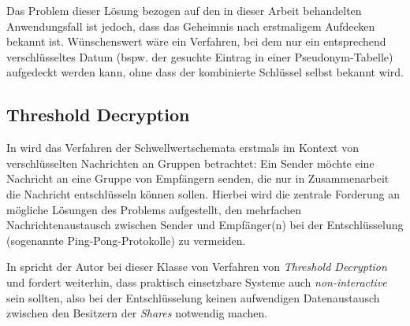 Das Problem dieser Lösung bezogen auf den in dieser Arbeit behandelten Anwendungsfall ist jedoch, dass das Geheimnis nach erstmaligem Aufdecken bekannt ist. Wünschenswert wäre ein Verfahren, bei dem nur ein entsprechend verschlüsseltes Datum (bspw. der gesuchte Eintrag in einer Pseudonym-Tabelle) aufgedeckt werden kann, ohne dass der kombinierte Schlüssel selbst bekannt wird. 

\subsection{Threshold Decryption}


\label{sec_basics_threshold_thresholddecryption}

In \cite{desmedt1987} wird das Verfahren der Schwellwertschemata erstmals im Kontext von verschlüsselten Nachrichten an Gruppen betrachtet: Ein Sender möchte eine Nachricht an eine Gruppe von Empfängern senden, die nur in Zusammenarbeit die Nachricht entschlüsseln können sollen. Hierbei wird die zentrale Forderung an mögliche Lösungen des Problems aufgestellt, den mehrfachen Nachrichtenaustausch zwischen Sender und Empfänger(n) bei der Entschlüsselung (sogenannte Ping-Pong-Protokolle) zu vermeiden. 

In \cite{desmedt1993} spricht der Autor bei dieser Klasse von Verfahren von \textit{Threshold Decryption} und fordert weiterhin, dass praktisch einsetzbare Systeme auch \textit{non-interactive} sein sollten, also bei der Entschlüsselung keinen aufwendigen Datenaustausch zwischen den Besitzern der \textit{Shares} notwendig machen.

